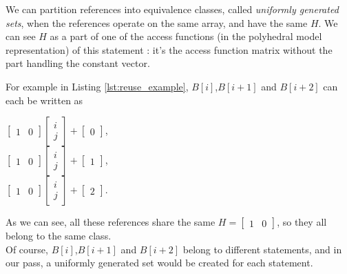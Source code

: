 \documentclass[paper=a4, fontsize=11.5pt]{scrartcl}
\numberwithin{equation}{section}        %
\numberwithin{figure}{section}          %
\numberwithin{table}{section}               %
\begin{document}
            We can partition references into equivalence classes, called \textit{uniformly generated sets},
            when the references operate on the same array, and have the same $H$.
            We can see $H$ as a part of one of the access functions (in the polyhedral model representation) of this statement :
            it's the access function matrix without the part handling the constant vector.

            For example in Listing \ref{lst:reuse_example}, $B[i]$,$B[i+1]$ and $B[i+2]$ can each be written as
            \begin{center}
                $
                \begin{bmatrix}
                    1 & 0
                \end{bmatrix}
                \begin{bmatrix}
                    i\\
                    j
                \end{bmatrix}
                +
                \begin{bmatrix}
                    0
                \end{bmatrix}
                $,\\
                $
                \begin{bmatrix}
                    1 & 0
                \end{bmatrix}
                \begin{bmatrix}
                    i\\
                    j
                \end{bmatrix}
                +
                \begin{bmatrix}
                    1
                \end{bmatrix}
                $,\\
                $
                \begin{bmatrix}
                    1 & 0
                \end{bmatrix}
                \begin{bmatrix}
                    i\\
                    j
                \end{bmatrix}
                +
                \begin{bmatrix}
                    2
                \end{bmatrix}
                $.
            \end{center}
            As we can see, all these references share the same $H=\begin{bmatrix}1 & 0\end{bmatrix}$,
            so they all belong to the same class.\\
            Of course, $B[i]$,$B[i+1]$ and $B[i+2]$ belong to different statements, and in
            our pass, a uniformly generated set would be created for each statement.
\end{document}
